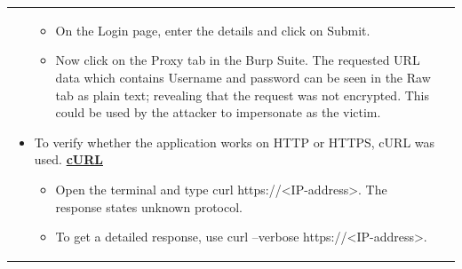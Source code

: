 \begin{longtable*}{p{.20\textwidth} | p{.80\textwidth}}
\begin{itemize}
\begin{itemize}
       		  \item On the Login page, enter the details and click on Submit.
       		  
       		  \item Now click  on the Proxy tab in the Burp Suite. The requested URL data which contains Username and password can be seen in the Raw tab as plain text; revealing that the request was not encrypted. This could be used by the attacker to impersonate as the victim. 
       		\end{itemize}
       	\item To verify whether the application works on HTTP or HTTPS, cURL was used. \underline{\textbf{cURL}}
       		\begin{itemize}
       		  \item Open the terminal and type curl https://<IP-address>.
       		         The response states unknown protocol. 
       		 \item  To get a detailed response, use curl --verbose https://<IP-address>.
       		 

\end{itemize}
\end{itemize}
\end{longtable*}
